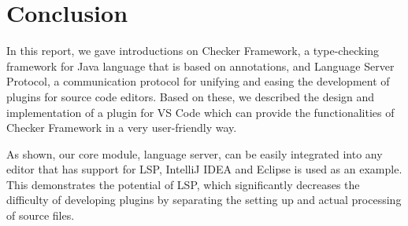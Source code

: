 \documentclass{article}
\begin{document}
\section{Conclusion}

In this report, we gave introductions on Checker Framework, a type-checking
framework for Java language that is based on annotations, and Language Server
Protocol, a communication protocol for unifying and easing the development of
plugins for source code editors. Based on these, we described the design and
implementation of a plugin for VS Code which can provide the functionalities of
Checker Framework in a very user-friendly way.

As shown, our core module, language server, can be easily integrated into any
editor that has support for LSP, IntelliJ IDEA and Eclipse is used as an
example. This demonstrates the potential of LSP, which significantly decreases
the difficulty of developing plugins by separating the setting up and actual
processing of source files.
\end{document}
